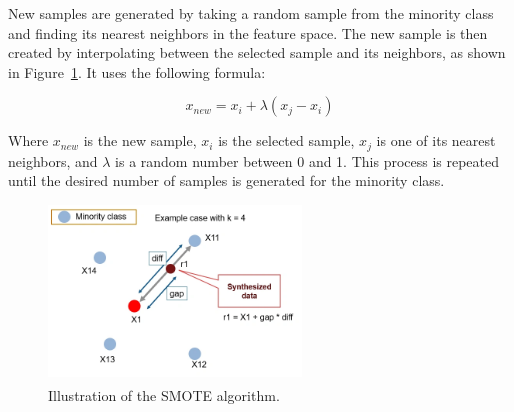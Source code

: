 New samples are generated by taking a random sample from the minority class and finding its nearest neighbors in the feature space. The new sample
is then created by interpolating between the selected sample and its neighbors, as shown in Figure~\ref{fig:smote}. It uses the following formula:

\begin{equation}
	x_{new} = x_{i} + \lambda (x_{j} - x_{i})
\end{equation}

Where $x_{new}$ is the new sample, $x_{i}$ is the selected sample, $x_{j}$ is one of its nearest neighbors, and $\lambda$ is a random number
between 0 and 1. This process is repeated until the desired number of samples is generated for the minority class.

\begin{figure}[htbp!]
	\centering
	\includegraphics[width=0.6\textwidth]{../imgs/smote.png}
	\caption{Illustration of the SMOTE algorithm.\textsuperscript{\cite{analyticsvidhya-2020}}}
	\label{fig:smote}
\end{figure}